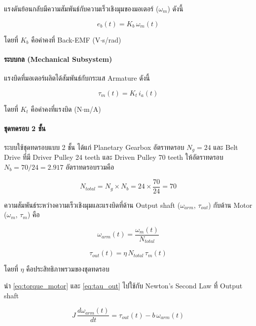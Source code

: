 แรงดันย้อนกลับมีความสัมพันธ์กับความเร็วเชิงมุมของมอเตอร์ ($\omega_m$) ดังนี้

\begin{equation}
  e_b(t) = K_b\, \omega_m(t)
  \label{eq:bemf}
\end{equation}

โดยที่ $K_b$ คือค่าคงที่ Back-EMF (V$\cdot$s/rad)

\paragraph{ระบบกล (Mechanical Subsystem)}

แรงบิดที่มอเตอร์ผลิตได้สัมพันธ์กับกระแส Armature ดังนี้

\begin{equation}
  \tau_m(t) = K_t\, i_a(t)
  \label{eq:torque_motor}
\end{equation}

โดยที่ $K_t$ คือค่าคงที่แรงบิด (N$\cdot$m/A)

\paragraph{ชุดทดรอบ 2 ชั้น}

ระบบใช้ชุดทดรอบแบบ 2 ชั้น ได้แก่ Planetary Gearbox อัตราทดรอบ
$N_g = 24$ และ Belt Drive ที่มี Driver Pulley 24 teeth และ Driven Pulley 70 teeth
ให้อัตราทดรอบ $N_b = 70/24 = 2.917$ อัตราทดรอบรวมคือ

\begin{equation}
  N_{total} = N_g \times N_b = 24 \times \frac{70}{24} = 70
  \label{eq:gear_ratio}
\end{equation}

ความสัมพันธ์ระหว่างความเร็วเชิงมุมและแรงบิดที่ด้าน Output shaft
($\omega_{arm}$, $\tau_{out}$) กับด้าน Motor ($\omega_m$, $\tau_m$) คือ

\begin{equation}
  \omega_{arm}(t) = \frac{\omega_m(t)}{N_{total}}
  \label{eq:omega_arm}
\end{equation}

\begin{equation}
  \tau_{out}(t) = \eta\, N_{total}\, \tau_m(t)
  \label{eq:tau_out}
\end{equation}

โดยที่ $\eta$ คือประสิทธิภาพรวมของชุดทดรอบ

นำ \cref{eq:torque_motor} และ \cref{eq:tau_out} ไปใช้กับ
Newton's Second Law ที่ Output shaft

\begin{equation}
  J\, \frac{d\omega_{arm}(t)}{dt} = \tau_{out}(t) - b\, \omega_{arm}(t)
  \label{eq:newton}
\end{equation}


